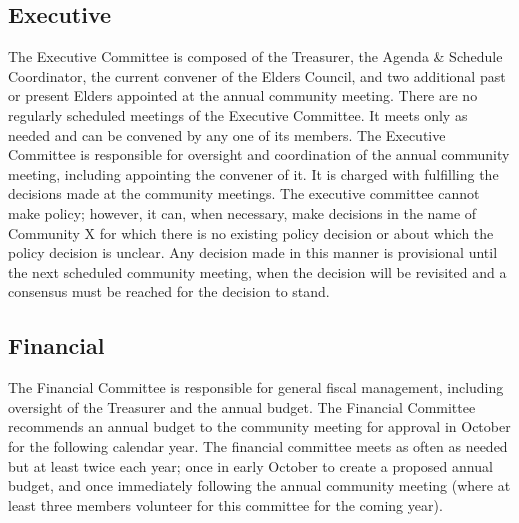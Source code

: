 \subsection*{Executive}
The Executive Committee is composed of the Treasurer, the Agenda \& Schedule Coordinator, the current convener of the Elders Council, and two additional past or present Elders appointed at the annual community meeting. There are no regularly scheduled meetings of the Executive Committee. It meets only as needed and can be convened by any one of its members. The Executive Committee is responsible for oversight and coordination of the annual community meeting, including appointing the convener of it. It is charged with fulfilling the decisions made at the community meetings. The executive committee cannot make policy; however, it can, when necessary, make decisions in the name of Community X for which there is no existing policy decision or about which the policy decision is unclear. Any decision made in this manner is provisional until the next scheduled community meeting, when the decision will be revisited and a consensus must be reached for the decision to stand.

\subsection*{Financial}
The Financial Committee is responsible for general fiscal management, including oversight of the Treasurer and the annual budget. The Financial Committee recommends an annual budget to the community meeting for approval in October for the following calendar year. The financial committee meets as often as needed but at least twice each year; once in early October to create a proposed annual budget, and once immediately following the annual community meeting (where at least three members volunteer for this committee for the coming year).


